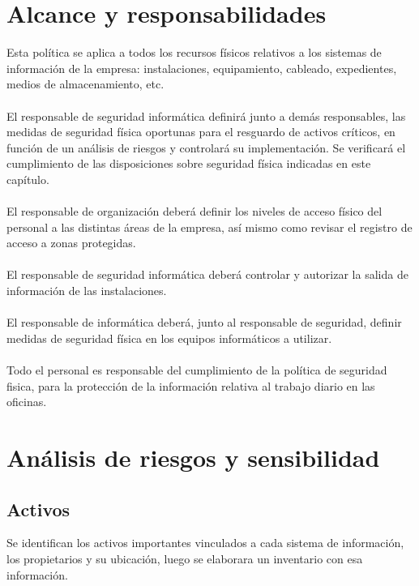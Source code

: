 \documentclass[11pt,bibtotoc,noliststotoc,BCOR0mm]{scrbook}
\begin{document}
\begin{itemize}
\end{itemize}

\section{Alcance y responsabilidades}
Esta política se aplica a todos los recursos físicos relativos a los sistemas de información de la empresa: instalaciones, equipamiento, cableado, expedientes, medios de almacenamiento,
etc.\\
\\
El responsable de seguridad informática definirá junto a demás responsables, las medidas de seguridad física oportunas para el resguardo de activos críticos, en función de un análisis de riesgos y controlará su implementación. Se verificará el cumplimiento de las disposiciones sobre seguridad física indicadas en este capítulo.  \\\\
El responsable de organización deberá definir los niveles de acceso físico del personal a las distintas áreas de la empresa, así mismo como revisar el registro de acceso a zonas protegidas.\\\\
El responsable de seguridad informática deberá controlar y autorizar la salida de información de las instalaciones.\\\\
El responsable de informática deberá, junto al responsable de seguridad, definir medidas de seguridad física en los equipos informáticos a utilizar.\\\\
Todo el personal es responsable del cumplimiento de la política de seguridad fisica, para la protección de la información relativa al trabajo diario en las oficinas.\\

\section{Análisis de riesgos y sensibilidad}

\subsection{Activos}


Se identifican los activos importantes vinculados a cada sistema de información, los propietarios y su ubicación, luego se elaborara un inventario con esa información.
\end{document}
